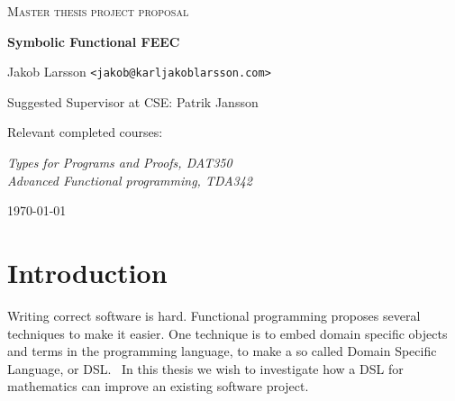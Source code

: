 \documentclass{scrartcl}
\begin{document}
\begin{titlepage}

\centering
{\scshape\LARGE Master thesis project proposal}

\vspace{0.5cm}
{\huge\bfseries Symbolic Functional FEEC}

\vspace{2cm}
{\Large Jakob Larsson \texttt{<jakob@karljakoblarsson.com>}}

\vspace{1.0cm}
{\large Suggested Supervisor at CSE: Patrik Jansson }

\vspace{1.5cm}
{\large Relevant completed courses:}

{\itshape
Types for Programs and Proofs, DAT350 \\
Advanced Functional programming, TDA342 \\
}

\vfill
{\large \today}

\end{titlepage}


%
%

\section{Introduction}




Writing correct software is hard.  Functional programming proposes several
techniques to make it easier.  One technique is to embed domain specific
objects and terms in the programming language, to make a so called Domain
Specific Language, or DSL.~\cite{van2000domain} In this thesis we wish to
investigate how a DSL for mathematics can improve an existing software project.
\end{document}
